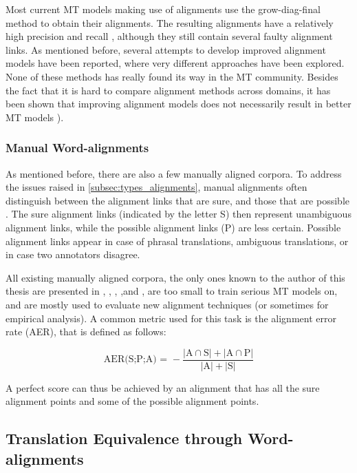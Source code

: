 Most current MT models making use of alignments use the grow-diag-final method to obtain their alignments. The resulting alignments have a relatively high precision and recall \citep{och2000improved}, although they still contain several faulty alignment links. As mentioned before, several attempts to develop improved alignment models have been reported, where very different approaches have been explored. None of these methods has really found its way in the MT community. Besides the fact that it is hard to compare alignment methods across domains, it has been shown that improving alignment models does not necessarily result in better MT models \citep{indurkhya2010handbook}).

\subsubsection{Manual Word-alignments}\label{subsubsec:man_alignments}

As mentioned before, there are also a few manually aligned corpora. To address the issues raised in \ref{subsec:types_alignments}, manual alignments often distinguish between the alignment links that are sure, and those that are possible \citep{lambert2005guidelines}. The sure alignment links (indicated by the letter S) then represent unambiguous alignment links, while the possible alignment links (P) are less certain. Possible alignment links appear in case of phrasal translations, ambiguous translations, or in case two annotators disagree. 

All existing manually aligned corpora, the only ones known to the author of this thesis are presented in \cite{och2000improved}, \cite{graca2008building}, \cite{mihalcea2003evaluation}, \cite{pado2006optimal},and \cite{ahrenberg2000evaluation}, are too small to train serious MT models on, and are mostly used to evaluate new alignment techniques (or sometimes for empirical analysis). A common metric used for this task is the alignment error rate (AER), that is defined as follows:

$$
\text{AER(S;P;A) = } - \frac{|\text{A}\cap\text{S}| + |\text{A}\cap\text{P}|}{|\text{A}| + |\text{S}|}
$$

A perfect score can thus be achieved by an alignment that has all the sure alignment points and some of the possible alignment points.



\subsection{Translation Equivalence through Word-alignments}

